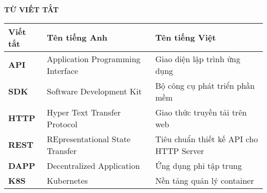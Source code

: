 \documentclass[../DoAn.tex]{subfiles}
\begin{document}
\begin{center}
	\Large{\textbf{TỪ VIẾT TẮT}}\\
\end{center}
\begin{longtable}{l p{6cm} p{7cm}}
	\hline
	\textbf{Viết tắt} & \textbf{Tên tiếng Anh}            & \textbf{Tên tiếng Việt}                 \\ \hline
	\textbf{API}      & Application Programming Interface & Giao diện lập trình ứng dụng            \\
	\textbf{SDK}      & Software Development Kit          & Bộ công cụ phát triển phần mềm          \\
	\textbf{HTTP}     & Hyper Text Transfer Protocol      & Giao thức truyền tải trên web           \\
	\textbf{REST}     & REpresentational State Transfer   & Tiêu chuẩn thiết kế API cho HTTP Server \\
	\textbf{DAPP}     & Decentralized Application         & Ứng dụng phi tập trung                  \\
	\textbf{K8S}      & Kubernetes                        & Nền tảng quản lý container              \\

	\hline
\end{longtable}
\end{document}
